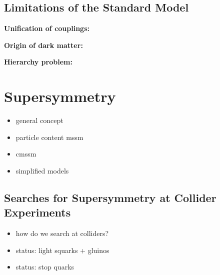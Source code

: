 \subsection{Limitations of the Standard Model}
\label{subsec:sm_shortcomings}

\begin{description}
\item \textbf{Unification of couplings:}
\item \textbf{Origin of dark matter:}
\item \textbf{Hierarchy problem:}
\end{description}

\section{Supersymmetry}
\label{sec:susy}

\begin{itemize}
\item general concept
\item particle content mssm
\item cmssm
\item simplified models
\end{itemize}


\subsection{Searches for Supersymmetry at Collider Experiments}
\label{subsec:susy_status}

\begin{itemize}
\item how do we search at colliders?
\item status: light squarks + gluinos
\item status: stop quarks
\end{itemize}
